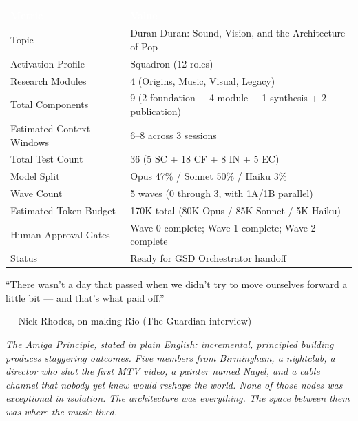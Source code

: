 \documentclass[11pt,letterpaper]{article}
\newcommand{\tableheader}[1]{\textbf{\sffamily\textcolor{white}{#1}}}
\begin{document}
\begin{center}
\begin{tabularx}{\textwidth}{L{5cm}X}
\toprule
{}
\tableheader{Metric} & \tableheader{Value} \\
\midrule
Topic & Duran Duran: Sound, Vision, and the Architecture of Pop \\
Activation Profile & Squadron (12 roles) \\
Research Modules & 4 (Origins, Music, Visual, Legacy) \\
Total Components & 9 (2 foundation + 4 module + 1 synthesis + 2 publication) \\
Estimated Context Windows & 6--8 across 3 sessions \\
Total Test Count & 36 (5 SC + 18 CF + 8 IN + 5 EC) \\
Model Split & Opus 47\% / Sonnet 50\% / Haiku 3\% \\
Wave Count & 5 waves (0 through 3, with 1A/1B parallel) \\
Estimated Token Budget & 170K total (80K Opus / 85K Sonnet / 5K Haiku) \\
Human Approval Gates & Wave 0 complete; Wave 1 complete; Wave 2 complete \\
Status & Ready for GSD Orchestrator handoff \\
\bottomrule
\end{tabularx}
\end{center}

\vspace{2em}

\begin{quotebox}
{\large\sffamily\textcolor{primary}{``There wasn't a day that passed when we didn't try to move ourselves forward a little bit --- and that's what paid off.''}}

\vspace{0.5em}
{\small\sffamily\textcolor{subtlegray}{--- Nick Rhodes, on making Rio (The Guardian interview)}}

\vspace{1em}
{\small\itshape\textcolor{darktext}{The Amiga Principle, stated in plain English: incremental, principled building produces staggering outcomes. Five members from Birmingham, a nightclub, a director who shot the first MTV video, a painter named Nagel, and a cable channel that nobody yet knew would reshape the world. None of those nodes was exceptional in isolation. The architecture was everything. The space between them was where the music lived.}}
\end{quotebox}
\end{document}
